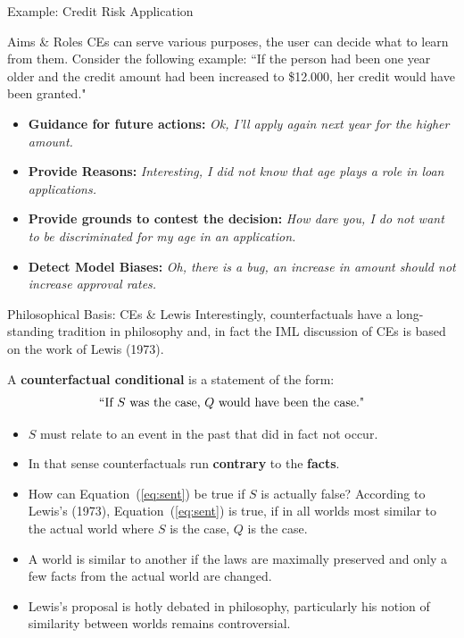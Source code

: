 \documentclass[11pt,compress,t,notes=noshow, xcolor=table]{beamer}
\begin{document}
\begin{vbframe}{Example: Credit Risk Application}
\end{vbframe}



\begin{vbframe}{Aims \& Roles}
	CEs can serve various purposes, the user can decide what to learn from them. Consider the following example:\newline
	``If the person had been one year older and the credit amount had been increased to \$12.000, her credit would have been granted."  \\[0.2cm]
	\begin{itemize}
		\itemsep1.3em
		\item \textbf{Guidance for future actions:} \textit{Ok, I'll apply again next year for the higher amount.}
		\item \textbf{Provide Reasons:} \textit{Interesting, I did not know that age plays a role in loan applications.}
		\item \textbf{Provide grounds to contest the decision:} \textit{How dare you, I do not want to be discriminated for my age in an application.}
		\item \textbf{Detect Model Biases:} \textit{Oh, there is a bug, an increase in amount should not increase approval rates.}
	\end{itemize}
\end{vbframe}

\begin{vbframe}{Philosophical Basis: CEs \& Lewis}
Interestingly, counterfactuals have a long-standing tradition in philosophy and, in fact the IML discussion of CEs is based on the work of Lewis (1973). 

A \textbf{counterfactual conditional} is a statement of the form:	
\begin{equation}
		\textnormal{``If $S$ was the case, $Q$ would have been the case."}
		\label{eq:sent}
\end{equation}
	\begin{itemize}
		\item $S$ must relate to an event in the past that did in fact not occur.
		\item In that sense counterfactuals run \textbf{contrary} to the \textbf{facts}.
		\item How can Equation~(\ref{eq:sent}) be true if $S$ is actually false? According to Lewis's (1973), Equation~(\ref{eq:sent}) is true, if in all worlds most similar to the actual world where $S$ is the case, $Q$ is the case. 
		\item A world is similar to another if the laws are maximally preserved and only a few facts from the actual world are changed.
		\item Lewis's proposal is hotly debated in philosophy, particularly his notion of similarity between worlds remains controversial. 
	\end{itemize}
\end{vbframe}
\end{document}
